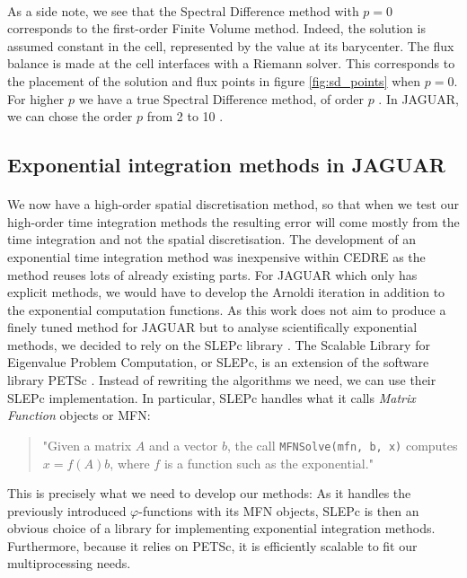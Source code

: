       \paragraph{}
      As a side note, we see that the Spectral Difference method with $p = 0$ corresponds to the first-order Finite Volume method.
      Indeed, the solution is assumed constant in the cell, represented by the value at its barycenter.
      The flux balance is made at the cell interfaces with a Riemann solver.
      This corresponds to the placement of the solution and flux points in figure \ref{fig:sd_points} when $p = 0$.
      For higher $p$ we have a true Spectral Difference method, of order $p$ .
      In JAGUAR, we can chose the order $p$ from 2 to 10 .


    \subsection{Exponential integration methods in JAGUAR}

      \paragraph{}
      We now have a high-order spatial discretisation method, so that when we test our high-order time integration methods the resulting error will come mostly from the time integration and not the spatial discretisation.
      The development of an exponential time integration method was inexpensive within CEDRE as the method reuses lots of already existing parts.
      For JAGUAR which only has explicit methods, we would have to develop the Arnoldi iteration in addition to the exponential computation functions.
      As this work does not aim to produce a finely tuned method for JAGUAR but to analyse scientifically exponential methods, we decided to rely on the SLEPc library \cite{HernandezRomanVidal2005}.
      The Scalable Library for Eigenvalue Problem Computation, or SLEPc, is an extension of the software library PETSc \cite{petsc-web-page, petsc-user-ref, petsc-efficient}.
      Instead of rewriting the algorithms we need, we can use their SLEPc implementation.
      In particular, SLEPc handles what it calls \emph{Matrix Function} objects or MFN:
      \begin{quote}
        "Given a matrix $A$ and a vector $b$, the call \texttt{MFNSolve(mfn, b, x)} computes \\
        $x=f\left(A\right) b$, where $f$ is a function such as the exponential."
      \end{quote}
      This is precisely what we need to develop our methods:
      As it handles the previously introduced $\varphi$-functions with its MFN objects, SLEPc is then an obvious choice of a library for implementing exponential integration methods.
      Furthermore, because it relies on PETSc, it is efficiently scalable to fit our multiprocessing needs.

